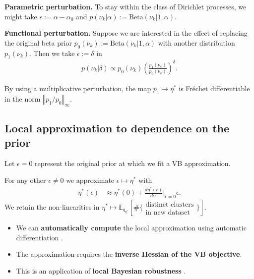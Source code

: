 \documentclass[a0,plainsections,30pt]{sciposter}\usepackage[]{graphicx}\usepackage[]{color}
\newcommand{\Expect}{\mathbb{E}}
\newcommand{\etaopt}{\eta^{*}}
\newcommand{\targetexpectation}{\Expect_{q_{\eta^*}}
\left[\#\{\substack{\text{distinct clusters}\\\text{in new dataset}}\} \right]}
\begin{document}
\begin{minipage}[t]{0.45\textwidth}

\textbf{Parametric perturbation.} To stay within the class of Dirichlet
processes, we might take $\epsilon := \alpha - \alpha_0$ and $p(\nu_k | \alpha) :=
\mathrm{Beta}(\nu_k | 1, \alpha)$.

\textbf{Functional perturbation.} Suppose we are interested in the effect of
replacing the original beta prior $p_0(\nu_k) := \mathrm{Beta}(\nu_k | 1,
\alpha)$ with another distribution $p_1(\nu_k)$. Then we take $\epsilon :=
\delta$ in
%
\vspace{-0.3in}
\begin{align*}
p(\nu_k \vert \delta) \propto
    p_{0}(\nu_k)\left(\frac{p_1(\nu_k)}{p_0(\nu_k)}\right)^\delta.
\end{align*}
\vspace{-0.3in}

By using a multiplicative perturbation, the map $p_1 \mapsto \etaopt$ is
Fr\'{e}chet differentiable in the norm $\left\Vert p_1 / p_0
\right\Vert_\infty$.

\vspace{-0.3in}
\subsection*{Local approximation to dependence on the prior}
\vspace{-0.2in}
Let $\epsilon=0$ represent the original prior at which we fit a VB
approximation.

\begin{mdframed}[style=MyFrame]
For any other $\epsilon \ne 0$ we approximate $\epsilon \mapsto \etaopt$ with
\begin{align*}
\eta^*(\epsilon)  &\approx  \eta^*(0) +
\frac{d \eta^*(\epsilon)}{d\epsilon^T}\Big|_{\epsilon=0} \epsilon.
\end{align*}
We retain the non-linearities in $\etaopt \mapsto \targetexpectation$.
\end{mdframed}

\begin{itemize}
\item We can \textbf{automatically compute}
    the local approximation
    using automatic differentiation \cite{giordano:2017:covariances}.
\item The approximation requires the
    \textbf{inverse Hessian of the VB objective}.
\item This is an application of \textbf{local Bayesian robustness}
\citep{gustafson:1996:localposterior}.
\end{itemize}


\end{minipage}
\end{document}
